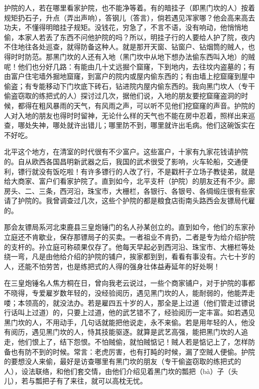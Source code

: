 \documentclass[12pt,UTF8]{ctexbook}
\begin{document}
护院的人，若在哪里看家护院，也不能净等着。有的暗挂子（即黑门坎的人）按着规矩扔石子，升点（弄出声响），答钢儿（答言），倘若遇见浑家哪？他会高来高去功夫，不懂得明暗挂子规矩。没钱花，穷急了，不言不语，没有响动，他悄悄地偷，本家人若丢了东西不问他护院的吗？所以，明挂子行的人要给人护了院，夜内不住地往各处巡查，就得防备这种人。就是那开天窗、钻窗户、钻烟筒的贼人，也得时时防范。那黑门坎的人还有入地（黑门坎中从地下想办法偷东西叫入地）的贼呢！他们也分好几路：有能由几十丈远掘个窟窿，下到地内，去往坟内盗墓的；有由富户住宅墙外掘地窟窿，到富户的院内或屋内偷东西的；有由墙上挖窟窿到屋中偷盗；有专能移动下门坎底下砖石，钻进院内屋内偷东西的。我向黑门坎人（专干偷盗窃取的练把式的人）探讨过几次，据他们说，入地的朋友要挖窟窿盗洞的时候，都得在粗风暴雨的天气，有风雨之声，可以听不见他们挖窟窿的声音。护院的人对入地的朋友也得时时留神，无论什么样的天气也不能在房中忍着，照样出来巡查，哪处失神，哪处就许出错儿；哪里防不到，哪里就许出毛病。他们这碗饭实在不好吃。

北平这个地方，在清室的时代很有不少富户。这些富户，十家有九家花钱请护院的。自从欧西各国昌明新武器之后，我国的武术很受了影响，火车轮船，交通便利，镖行就没有饭吃啦！有许多镖行的人改了行，不是戳杆子立场子教徒弟，就是给大商家、富户们看家护院了。直到如今，北平支杆（护院）的朋友还有不少。廊房头、二、三条，西河沿，珠宝市，大栅栏，各银行、各银号、各绸缎庄很有些家请了护院的。我曾调查过几次，这些个护院的都是粮食店街南头路西会友镖局代雇的。

那会友镖局系河北束鹿县三皇炮锤门的名人孙某创立的。直到如今，他们的东家孙立庭还不肯歇业，保存那镖局子的买卖。一者祖业不肯扔，二者是专为给介绍护院的支杆的。孙立庭可称硕果仅存了。他每天早起必到西河沿、珠宝市、大栅栏等处绕一弯，凡是由他给介绍的护院的铺户，挨家都到到，看看有事没有。六七十岁的人，还能不怕劳苦，也是练把式的人得的强身壮体益寿延年的好处啊！

在三皇炮锤名人焦方桐在日，曾向我老云说过，一些个商家铺户，对于护院的事都不晓得，专爱雇岁数年轻的，没经验阅历，遇见黑门坎的人，能耐弱的，他能弄走喽；本领高的，就没法办。若是雇四五十岁的人，那全是上过道（他们管走过镖说行话叫上过道）的，只要上过道，他的武艺错不了，经验阅历一定丰富。如若遇见黑门坎的人，不用动手，几句话就能把他说走，永不来偷。若是用年轻的人，他没有阅历，遇见黑门坎的人，恃其技能驱逐。就算是武艺高强，能把黑门坎的人追走，他们恨上了，结下怨恨。不怕贼偷，就怕贼惦记！贼人若是惦记上了，怎样防备也有防不到的时候。常言：老虎厉害，也有打盹的时候，漏了空贼人便偷。护院的要想没人来偷，最好是访查哪里有黑门坎的朋友（专干偷盗窃取的练把式的人），设法联络，和他们套交情，由他们介绍见着黑门坎的瓢把（bà）子（头儿），若与瓢把子有了来往，就可以高枕无忧。
\end{document}
